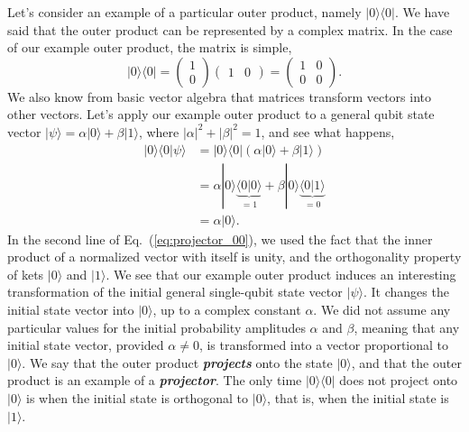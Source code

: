Let's consider an example of a particular outer product, namely $|0\rangle\langle0|$.
We have said that the outer product can be represented by a complex matrix.
In the case of our example outer product, the matrix is simple,
\begin{equation}
    |0\rangle\langle0| = \begin{pmatrix} 1 \\ 0 \end{pmatrix} \begin{pmatrix} 1 & 0 \end{pmatrix} = \begin{pmatrix} 1 & 0 \\ 0 & 0 \end{pmatrix}.
\end{equation}
We also know from basic vector algebra that matrices transform vectors into other vectors.
Let's apply our example outer product to a general qubit state vector $|\psi\rangle = \alpha|0\rangle + \beta|1\rangle$, where $|\alpha|^2+|\beta|^2=1$, and see what happens,
\begin{align}
    |0\rangle\langle0|\psi\rangle & = |0\rangle\langle0| \left( \alpha|0\rangle + \beta|1\rangle \right) \label{eq:projector_00}\\
    & = \alpha |0\rangle\underbrace{\langle0|0\rangle}_{=1} + \beta |0\rangle\underbrace{\langle0|1\rangle}_{=0} \nonumber\\
    & = \alpha|0\rangle. \nonumber
\end{align}
In the second line of Eq.~(\ref{eq:projector_00}), we used the fact that the inner product of a normalized vector with itself is unity, and the orthogonality property of kets $|0\rangle$ and $|1\rangle$.
We see that our example outer product induces an interesting transformation of the initial general single-qubit state vector $|\psi\rangle$.
It changes the initial state vector into $|0\rangle$, up to a complex constant $\alpha$.
We did not assume any particular values for the initial probability amplitudes $\alpha$ and $\beta$, meaning that any initial state vector, provided $\alpha\neq0$, is transformed into a vector proportional to $|0\rangle$.
We say that the outer product \textit{\textbf{projects}} onto the state $|0\rangle$, and that the outer product is an example of a \textit{\textbf{projector}}.
The only time $|0\rangle\langle0|$ does not project onto $|0\rangle$ is when the initial state is orthogonal to $|0\rangle$, that is, when the initial state is $|1\rangle$.

